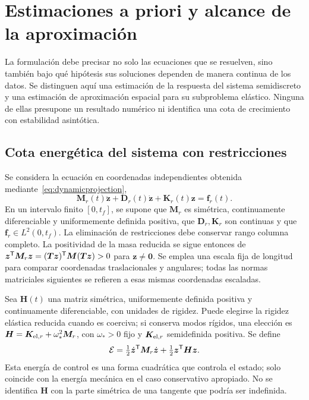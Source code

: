 \section{Estimaciones a priori y alcance de la aproximación}
\label{sec:apriori}
La formulación debe precisar no solo las ecuaciones que se resuelven, sino también bajo qué hipótesis sus soluciones dependen de manera continua de los datos. Se distinguen aquí una estimación de la respuesta del sistema semidiscreto y una estimación de aproximación espacial para su subproblema elástico. Ninguna de ellas presupone un resultado numérico ni identifica una cota de crecimiento con estabilidad asintótica.

\subsection{Cota energética del sistema con restricciones}
Se considera la ecuación en coordenadas independientes obtenida mediante~\eqref{eq:dynamicprojection},
\begin{equation}
\bm M_r(t)\ddot{\bm z}+\bm D_r(t)\dot{\bm z}+\bm K_r(t)\bm z=\bm f_r(t).
\label{eq:ap-system}
\end{equation}
En un intervalo finito $[0,t_f]$, se supone que $\bm M_r$ es simétrica, continuamente diferenciable y uniformemente definida positiva, que $\bm D_r,\bm K_r$ son continuas y que $\bm f_r\in L^2(0,t_f)$. La eliminación de restricciones debe conservar rango columna completo. La positividad de la masa reducida se sigue entonces de $\bm z^\mathsf T\bm M_r\bm z=(\bm T\bm z)^\mathsf T\bm M(\bm T\bm z)>0$ para $\bm z\ne\bm0$. Se emplea una escala fija de longitud para comparar coordenadas traslacionales y angulares; todas las normas matriciales siguientes se refieren a esas mismas coordenadas escaladas.

Sea $\bm H(t)$ una matriz simétrica, uniformemente definida positiva y continuamente diferenciable, con unidades de rigidez. Puede elegirse la rigidez elástica reducida cuando es coerciva; si conserva modos rígidos, una elección es $\bm H=\bm K_{{\rm el},r}+\omega_*^2\bm M_r$, con $\omega_*>0$ fijo y $\bm K_{{\rm el},r}$ semidefinida positiva. Se define
\begin{equation}
\mathcal E=\tfrac12\dot{\bm z}^\mathsf T\bm M_r\dot{\bm z}
+\tfrac12\bm z^\mathsf T\bm H\bm z.
\label{eq:ap-energy}
\end{equation}
Esta energía de control es una forma cuadrática que controla el estado; solo coincide con la energía mecánica en el caso conservativo apropiado. No se identifica $\bm H$ con la parte simétrica de una tangente que podría ser indefinida.

